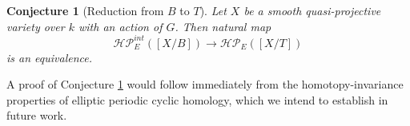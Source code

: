 \documentclass[11pt,letterpaper]{amsart}
\newtheorem{conjecture}[dummy]{Conjecture}
\newcommand{\cHP}{\mathcal{HP}}
\newcommand{\Mapo}[2]{\underline{\mathrm{Map}}^{0}\left (#1,#2\right )}
\begin{document}
\begin{conjecture}[Reduction from $B$ to $T$]\label{conjecture:HHEB}
Let $X$ be a smooth quasi-projective variety over $k$ with an action of $G$. Then natural map
$$\cHP_E^{int}([X/B])\to\cHP_E([X/T])$$
is an equivalence.
\end{conjecture}
A proof of Conjecture \ref{conjecture:HHEB} would follow immediately from the homotopy-invariance properties of elliptic periodic cyclic homology, which we intend to establish  in future work.
\end{document}
